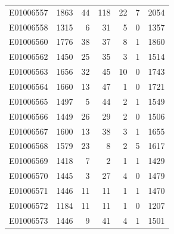 \documentclass[
  letterpaper,
  DIV=11,
  numbers=noendperiod]{scrreprt}
\begin{document}
\begin{tabular}{lrrrrrr}
E01006557     &    1863 &      44 &                   118 &                              22 &                       7 &              2054 \\
E01006558     &    1315 &       6 &                    31 &                               5 &                       0 &              1357 \\
E01006560     &    1776 &      38 &                    37 &                               8 &                       1 &              1860 \\
E01006562     &    1450 &      25 &                    35 &                               3 &                       1 &              1514 \\
E01006563     &    1656 &      32 &                    45 &                              10 &                       0 &              1743 \\
E01006564     &    1660 &      13 &                    47 &                               1 &                       0 &              1721 \\
E01006565     &    1497 &       5 &                    44 &                               2 &                       1 &              1549 \\
E01006566     &    1449 &      26 &                    29 &                               2 &                       0 &              1506 \\
E01006567     &    1600 &      13 &                    38 &                               3 &                       1 &              1655 \\
E01006568     &    1579 &      23 &                     8 &                               2 &                       5 &              1617 \\
E01006569     &    1418 &       7 &                     2 &                               1 &                       1 &              1429 \\
E01006570     &    1445 &       3 &                    27 &                               4 &                       0 &              1479 \\
E01006571     &    1446 &      11 &                    11 &                               1 &                       1 &              1470 \\
E01006572     &    1184 &      11 &                    11 &                               1 &                       0 &              1207 \\
E01006573     &    1446 &       9 &                    41 &                               4 &                       1 &              1501 \\

\end{tabular}
\end{document}
